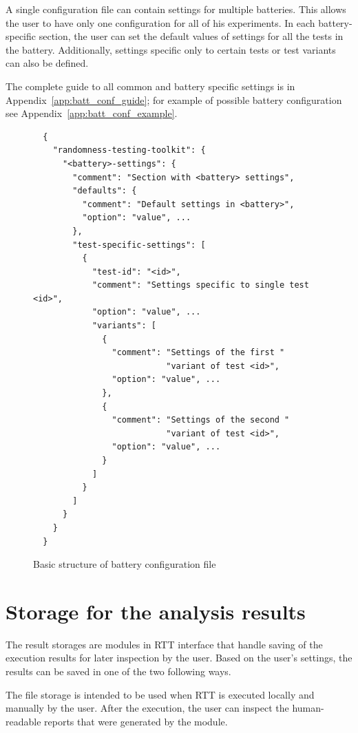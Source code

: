 \documentclass[
	digital,    %
	oneside,    %
	color,
	11pt,
	nocover,
	notable,
	nolof,
	nolot,
]{fithesis3}
\theoremstyle{definition}
\theoremstyle{remark}
\begin{document}
A single configuration file can contain settings for multiple batteries. This allows the user to have only one configuration for all of his experiments. In each battery-specific section, the user can set the default values of settings for all the tests in the battery. Additionally, settings specific only to certain tests or test variants can also be defined. 

The complete guide to all common and battery specific settings is in Appendix~\ref{app:batt_conf_guide}; for example of possible battery configuration see Appendix~\ref{app:batt_conf_example}.

\begin{figure}[h!]
\begin{verbatim}
  {
    "randomness-testing-toolkit": {
      "<battery>-settings": {
        "comment": "Section with <battery> settings",
        "defaults": {
          "comment": "Default settings in <battery>",
          "option": "value", ...
        },
        "test-specific-settings": [
          {
            "test-id": "<id>",
            "comment": "Settings specific to single test <id>",
            "option": "value", ...
            "variants": [
              {
                "comment": "Settings of the first "
                           "variant of test <id>",
                "option": "value", ...
              },
              {
                "comment": "Settings of the second "
                           "variant of test <id>",
                "option": "value", ...        
              }            
            ]	      
          }
        ]      
      }    
    }
  }
\end{verbatim}
\caption{Basic structure of battery configuration file}
\label{fig:batt_conf_short_json}
\end{figure}

\section{Storage for the analysis results}
\label{sec:result_storages}
The result storages are modules in RTT interface that handle saving of the execution results for later inspection by the user. Based on the user's settings, the results can be saved in one of the two following ways.

The file storage is intended to be used when RTT is executed locally and manually by the user. After the execution, the user can inspect the human-readable reports that were generated by the module. 
\end{document}
